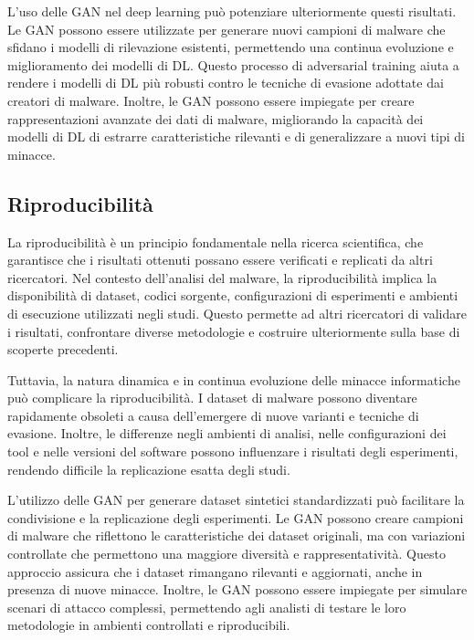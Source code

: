 L'uso delle GAN nel deep learning può potenziare ulteriormente questi risultati. Le GAN possono essere utilizzate per generare nuovi campioni di malware che sfidano i modelli di rilevazione esistenti, permettendo una continua evoluzione e miglioramento dei modelli di DL. Questo processo di adversarial training aiuta a rendere i modelli di DL più robusti contro le tecniche di evasione adottate dai creatori di malware. Inoltre, le GAN possono essere impiegate per creare rappresentazioni avanzate dei dati di malware, migliorando la capacità dei modelli di DL di estrarre caratteristiche rilevanti e di generalizzare a nuovi tipi di minacce.


\subsection{Riproducibilità}

La riproducibilità è un principio fondamentale nella ricerca scientifica, che garantisce che i risultati ottenuti possano essere verificati e replicati da altri ricercatori. Nel contesto dell'analisi del malware, la riproducibilità implica la disponibilità di dataset, codici sorgente, configurazioni di esperimenti e ambienti di esecuzione utilizzati negli studi. Questo permette ad altri ricercatori di validare i risultati, confrontare diverse metodologie e costruire ulteriormente sulla base di scoperte precedenti.

Tuttavia, la natura dinamica e in continua evoluzione delle minacce informatiche può complicare la riproducibilità. I dataset di malware possono diventare rapidamente obsoleti a causa dell'emergere di nuove varianti e tecniche di evasione. Inoltre, le differenze negli ambienti di analisi, nelle configurazioni dei tool e nelle versioni del software possono influenzare i risultati degli esperimenti, rendendo difficile la replicazione esatta degli studi.

L'utilizzo delle GAN per generare dataset sintetici standardizzati può facilitare la condivisione e la replicazione degli esperimenti. Le GAN possono creare campioni di malware che riflettono le caratteristiche dei dataset originali, ma con variazioni controllate che permettono una maggiore diversità e rappresentatività. Questo approccio assicura che i dataset rimangano rilevanti e aggiornati, anche in presenza di nuove minacce. Inoltre, le GAN possono essere impiegate per simulare scenari di attacco complessi, permettendo agli analisti di testare le loro metodologie in ambienti controllati e riproducibili.

